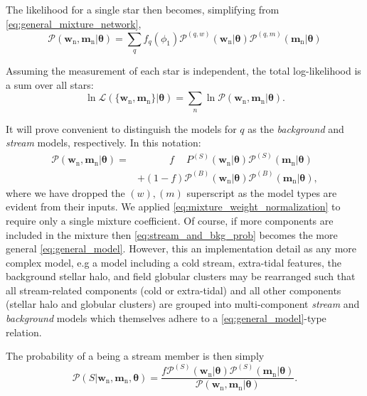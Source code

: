 \documentclass[twocolumn]{aastex631}
\newcommand{\mrm}[1]{\mathrm{#1}}
\newcommand{\mbs}[1]{\boldsymbol{#1}}
\newcommand{\mcal}[1]{\mathcal{#1}}
\newcommand{\pdf}{\mcal{P}}
\newcommand{\nth}[1]{{#1}_{\mrm{n}}}  %
\newcommand{\smallcomponent}[2]{#2^{\scriptscriptstyle (#1)}}
\newcommand{\cmp}[2]{\smallcomponent{#1}{#2}}
\newcommand{\Scmp}[1]{\cmp{S}{#1}}
\newcommand{\Bcmp}[1]{\cmp{B}{#1}}
\newcommand{\Spdf}{\Scmp{\pdf}}
\newcommand{\Bpdf}{\Bcmp{\pdf}}
\begin{document}
        The likelihood for a single star then becomes, simplifying from \autoref{eq:general_mixture_network},
        \begin{equation} \label{eq:general_model}
            \!\!\!\!\! \pdf(\nth{\mbs{w}}, \! \nth{\mbs{m}} | \mbs{\theta})
                \!=\! \sum_{q} \! f_q(\phi_1) \cmp{q,w}{\pdf}(\nth{\mbs{w}}|\mbs{\theta}) \cmp{q,m}{\pdf}(\nth{\mbs{m}}|\mbs{\theta})
        \end{equation}

        Assuming the measurement of each star is independent, the total
        log-likelihood is a sum over all stars:
        \begin{equation} \label{eq:general_likelihood}
            \ln\mcal{L}\left(\{\nth{\mbs{w}},\nth{\mbs{m}}\} | \mbs{\theta}\right) = \sum_n \ln \pdf(\nth{\mbs{w}}, \nth{\mbs{m}} | \mbs{\theta}).
        \end{equation}

        It will prove convenient to distinguish the models for $q$ as the
        \textit{background} and \textit{stream} models, respectively. In this
        notation:
        \begin{align} \label{eq:stream_and_bkg_prob}
            \pdf(\nth{\mbs{w}}, \nth{\mbs{m}} | \mbs{\theta})
            =& \phantom{+} \qquad f \phantom{+} \Scmp{P}(\nth{\mbs{w}}|\mbs{\theta}) \Spdf(\nth{\mbs{m}}|\mbs{\theta}) \\
            & + (1-f) \Bpdf(\nth{\mbs{w}}|\mbs{\theta}) \Bpdf(\nth{\mbs{m}}|\mbs{\theta}), \nonumber
        \end{align}
        where we have dropped the $(w), (m)$ superscript as the model types are evident from their inputs. We applied \autoref{eq:mixture_weight_normalization} to require only a single mixture coefficient.
        Of course, if more components are included in the mixture then \autoref{eq:stream_and_bkg_prob} becomes the more general \autoref{eq:general_model}. However, this an implementation detail as any more complex model, e.g a model including a cold stream, extra-tidal features, the background stellar halo, and field globular clusters may be rearranged such that all stream-related components (cold or extra-tidal) and all other components (stellar halo and globular clusters) are grouped into multi-component \textit{stream} and \textit{background} models which themselves adhere to a \autoref{eq:general_model}-type relation.

        The probability of a being a stream member is then simply
        \begin{equation}\label{eq:membership_prob}
            \pdf\left(S | \nth{\mbs{w}}, \nth{\mbs{m}}, \mbs{\theta} \right) = \frac{f \Spdf(\nth{\mbs{w}}|\mbs{\theta}) \Spdf(\nth{\mbs{m}}|\mbs{\theta}) }{ \pdf(\nth{\mbs{w}}, \nth{\mbs{m}} | \mbs{\theta})}.
        \end{equation}
\end{document}
